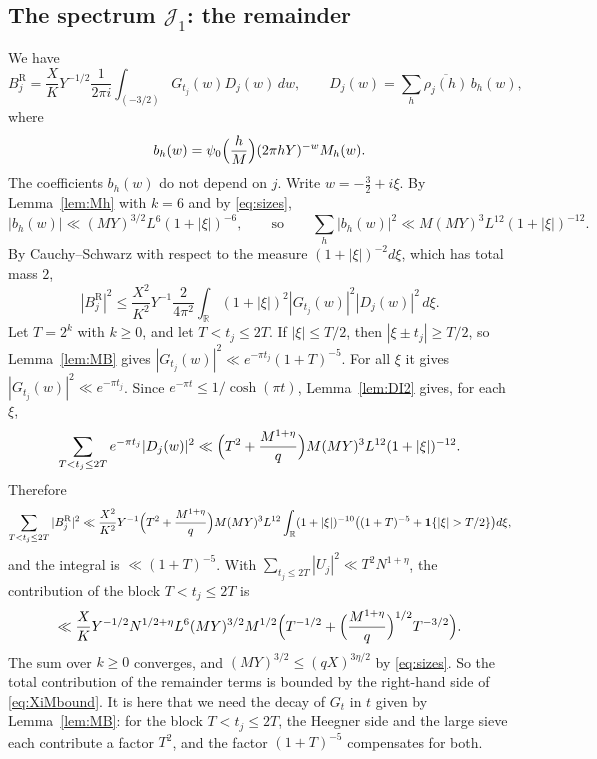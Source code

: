 \documentclass[11pt]{amsart}
\theoremstyle{remark}
\theoremstyle{definition}
\numberwithin{equation}{section}
\newcommand{\Jc}{\mathcal{J}}
\newcommand{\R}{\mathbb{R}}
\newcommand{\one}{\mathbf{1}}
\begin{document}
\subsection{The spectrum \texorpdfstring{$\Jc_1$}{J\_1}: the remainder}\label{sec:J1rem}
We have
\[
B_j^{\mathrm R}=\frac XKY^{-1/2}\frac1{2\pi i}\int_{(-3/2)}G_{t_j}(w)D_j(w)\,dw,\qquad D_j(w)=\sum_h\overline{\rho_j(h)}\,b_h(w),
\]
where
\[
b_h(w)=\psi_0\Bigl(\frac hM\Bigr)(2\pi hY)^{-w}M_h(w).
\]
The coefficients $b_h(w)$ do not depend on $j$. Write $w=-\frac32+i\xi$. By Lemma~\ref{lem:Mh} with $k=6$ and by \eqref{eq:sizes},
\[
|b_h(w)|\ll(MY)^{3/2}L^6(1+|\xi|)^{-6},\qquad\text{so}\qquad\sum_h|b_h(w)|^2\ll M(MY)^3L^{12}(1+|\xi|)^{-12}.
\]
By Cauchy--Schwarz with respect to the measure $(1+|\xi|)^{-2}d\xi$, which has total mass $2$,
\[
|B_j^{\mathrm R}|^2\le\frac{X^2}{K^2}Y^{-1}\frac{2}{4\pi^2}\int_\R(1+|\xi|)^2|G_{t_j}(w)|^2|D_j(w)|^2\,d\xi.
\]
Let $T=2^k$ with $k\ge0$, and let $T<t_j\le2T$. If $|\xi|\le T/2$, then $|\xi\pm t_j|\ge T/2$, so Lemma~\ref{lem:MB} gives $|G_{t_j}(w)|^2\ll e^{-\pi t_j}(1+T)^{-5}$. For all $\xi$ it gives $|G_{t_j}(w)|^2\ll e^{-\pi t_j}$. Since $e^{-\pi t}\le1/\cosh(\pi t)$, Lemma~\ref{lem:DI2} gives, for each $\xi$,
\[
\sum_{T<t_j\le2T}e^{-\pi t_j}|D_j(w)|^2\ll\Bigl(T^2+\frac{M^{1+\eta}}q\Bigr)M(MY)^3L^{12}(1+|\xi|)^{-12}.
\]
Therefore
\[
\sum_{T<t_j\le2T}|B_j^{\mathrm R}|^2\ll\frac{X^2}{K^2}Y^{-1}\Bigl(T^2+\frac{M^{1+\eta}}q\Bigr)M(MY)^3L^{12}\int_\R(1+|\xi|)^{-10}\bigl((1+T)^{-5}+\one\{|\xi|>T/2\}\bigr)d\xi,
\]
and the integral is $\ll(1+T)^{-5}$. With $\sum_{t_j\le2T}|U_j|^2\ll T^2N^{1+\eta}$, the contribution of the block $T<t_j\le2T$ is
\[
\ll\frac XKY^{-1/2}N^{1/2+\eta}L^6(MY)^{3/2}M^{1/2}\Bigl(T^{-1/2}+\Bigl(\frac{M^{1+\eta}}q\Bigr)^{1/2}T^{-3/2}\Bigr).
\]
The sum over $k\ge0$ converges, and $(MY)^{3/2}\le(qX)^{3\eta/2}$ by \eqref{eq:sizes}. So the total contribution of the remainder terms is bounded by the right-hand side of \eqref{eq:XiMbound}. It is here that we need the decay of $G_t$ in $t$ given by Lemma~\ref{lem:MB}: for the block $T<t_j\le2T$, the Heegner side and the large sieve each contribute a factor $T^2$, and the factor $(1+T)^{-5}$ compensates for both.
\end{document}
